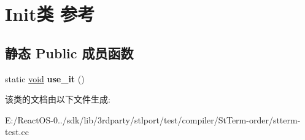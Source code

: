 \hypertarget{class_init}{}\section{Init类 参考}
\label{class_init}
\subsection*{静态 Public 成员函数}
\begin{DoxyCompactItemize}
\item 
\mbox{\label{class_init_a4dd440bc5f574ae680ee717044a7c90f}} 
static \hyperlink{interfacevoid}{void} {\bfseries use\+\_\+it} ()
\end{DoxyCompactItemize}


该类的文档由以下文件生成\+:\begin{DoxyCompactItemize}
\item 
E\+:/\+React\+O\+S-\/0../sdk/lib/3rdparty/stlport/test/compiler/\+St\+Term-\/order/stterm-\/test.\+cc\end{DoxyCompactItemize}
